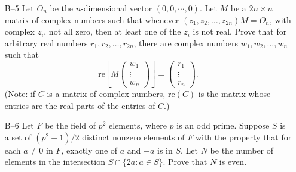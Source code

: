 \documentclass[amssymb,twocolumn,pra,10pt,aps]{revtex4-1}
\begin{document}
\begin{itemize}
\item[B--5]
Let $O_n$ be the $n$-dimensional vector $(0,0,\cdots, 0)$. Let $M$ be
a $2n \times n$ matrix of complex numbers such that whenever $(z_1,
z_2, \dots, z_{2n})M = O_n$, with complex $z_i$, not all zero, then at
least one of the $z_i$ is not real. Prove that for arbitrary real
numbers $r_1, r_2, \dots, r_{2n}$, there are complex numbers $w_1,
w_2, \dots, w_n$ such that
\[
\mathrm{re}\left[ M \left( \begin{array}{c} w_1 \\ \vdots \\ w_n \end{array}
\right) \right] = \left( \begin{array}{c} r_1 \\ \vdots \\ r_n
\end{array} \right).
\]
(Note: if $C$ is a matrix of complex numbers, $\mathrm{re}(C)$ is the matrix
whose entries are the real parts of the entries of $C$.)

\item[B--6]
Let $F$ be the field of $p^2$ elements, where $p$ is an odd
prime. Suppose $S$ is a set of $(p^2-1)/2$ distinct nonzero elements
of $F$ with the property that for each $a\neq 0$ in $F$, exactly one
of $a$ and $-a$ is in $S$. Let $N$ be the number of elements in the
intersection $S \cap \{2a: a \in S\}$. Prove that $N$ is even.

\end{itemize}
\end{document}
